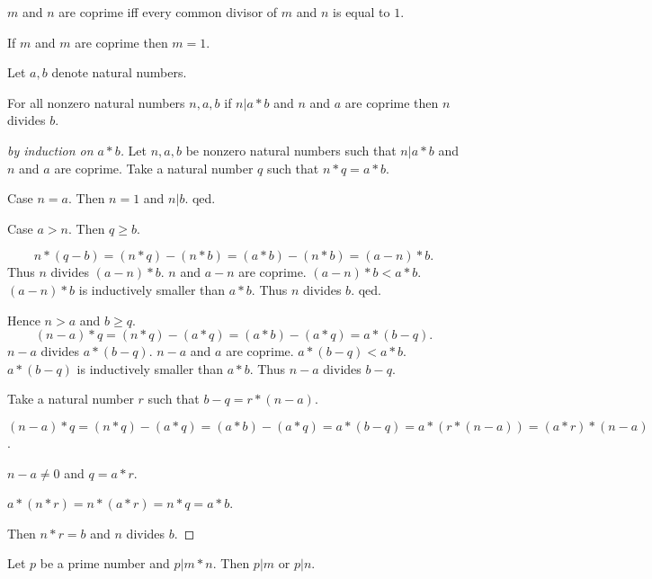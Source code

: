 \documentclass[11pt]{article}
\begin{document}
\begin{forthel}
\begin{definition}
$m$ and $n$ are coprime iff every common divisor of $m$ and $n$ is equal to $1$. 
\end{definition}

\begin{lemma}
If $m$ and $m$ are coprime then $m = 1$.
\end{lemma}

Let $a,b$ denote natural numbers.

\begin{lemma}
For all nonzero natural numbers $n,a,b$
if $n | a * b$ and $n$ and $a$ are coprime then $n$ divides $b$.
\end{lemma}

\begin{proof}[by induction on $a * b$]

Let $n,a,b$ be nonzero natural numbers such that $n | a * b$ and $n$ and $a$ are coprime.
Take a natural number $q$ such that $n * q = a * b$.


Case $n = a$. Then $n = 1$ and $n | b$. qed.

Case $a > n$. Then $q \geq b$.

$$n * (q - b) = (n * q) - (n * b) = (a * b) - (n * b) = (a - n) * b.$$
%
Thus $n$ divides $(a - n) * b$.
$n$ and $a - n$ are coprime.
$(a - n) * b <  a * b$.
$(a - n) * b$ is inductively smaller than $a * b$.
Thus $n$ divides $b$.
qed.

Hence $n > a$ and $b \geq q$.
$$(n - a) * q = (n * q) - (a * q) = (a * b) - (a * q) = a * (b - q).$$
$n - a$ divides $a * (b - q)$.
$n - a$ and $a$ are coprime.
$a * (b - q) < a * b$.
$a * (b - q)$ is inductively smaller than $a * b$.
Thus $n - a$ divides $b - q$.

Take a natural number $r$ such that $b - q = r * (n - a)$.

$(n - a) * q = (n * q) - (a * q) = (a * b) - (a * q)
= a * (b - q) = a * (r * (n - a)) = (a * r) * (n - a)$.

$n - a \neq 0$ and $q = a * r$.

$a * (n * r) = n * (a * r) = n * q = a * b$.

Then $n * r = b$ and $n$ divides $b$.
\end{proof}

\begin{theorem}
Let $p$ be a prime number and $p | m * n$. Then $p | m$ or $p | n$.
\end{theorem}

\end{forthel}
\end{document}
